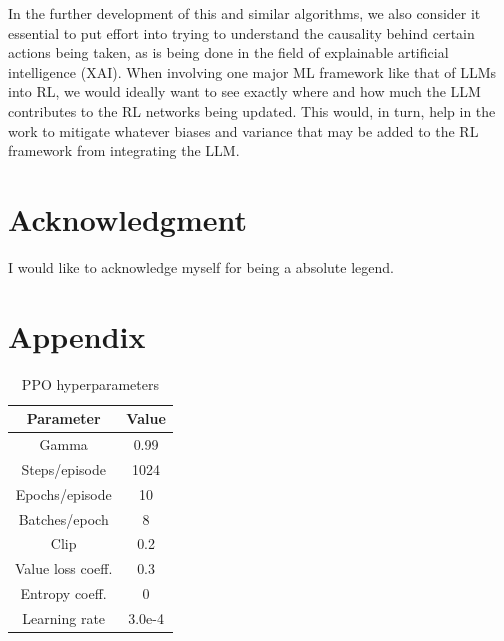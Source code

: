 \documentclass[conference]{IEEEtran}
\begin{document}
In the further development of this and similar algorithms, we also consider it essential to put effort into trying to understand the causality behind certain actions being taken, as is being done in the field of explainable artificial intelligence (XAI). When involving one major ML framework like that of LLMs into RL, we would ideally want to see exactly where and how much the LLM contributes to the RL networks being updated. This would, in turn, help in the work to mitigate whatever biases and variance that may be added to the RL framework from integrating the LLM.

\section*{Acknowledgment}

I would like to acknowledge myself for being a absolute legend.





\section*{Appendix}

\begin{table}[h]
\caption{PPO hyperparameters}
\begin{center}
\label{hyperparams_transposed}
\begin{tabular}{c | c}
Parameter & Value \\
\hline
Gamma & 0.99 \\
Steps/episode & 1024 \\
Epochs/episode & 10 \\
Batches/epoch & 8 \\
Clip & 0.2 \\
Value loss coeff. & 0.3 \\
Entropy coeff. & 0 \\
Learning rate & 3.0e-4 \\
\end{tabular}
\end{center}
\end{table}
\end{document}
